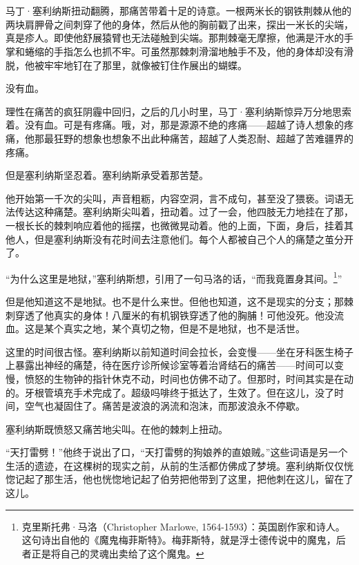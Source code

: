 \documentclass[AutoFakeBold=true]{book}
\begin{document}
\chapter{}

马丁·塞利纳斯扭动翻腾，那痛苦带着十足的诗意。一根两米长的钢铁荆棘从他的两块肩胛骨之间刺穿了他的身体，然后从他的胸前戳了出来，探出一米长的尖端，真是疹人。即使他舒展猿臂也无法碰触到尖端。那荆棘毫无摩擦，他满是汗水的手掌和蜷缩的手指怎么也抓不牢。可虽然那棘刺滑溜地触手不及，他的身体却没有滑脱，他被牢牢地钉在了那里，就像被钉住作展出的蝴蝶。

没有血。

理性在痛苦的疯狂阴霾中回归，之后的几小时里，马丁·塞利纳斯惊异万分地思索着。没有血。可是有疼痛。哦，对，那是源源不绝的疼痛——超越了诗人想象的疼痛，他那最狂野的想象也想象不出此种痛苦，超越了人类忍耐、超越了苦难疆界的疼痛。

但是塞利纳斯坚忍着。塞利纳斯承受着那苦楚。

他开始第一千次的尖叫，声音粗粝，内容空洞，言不成句，甚至没了猥亵。词语无法传达这种痛楚。塞利纳斯尖叫着，扭动着。过了一会，他四肢无力地挂在了那，一根长长的棘刺响应着他的摇摆，也微微晃动着。他的上面，下面，身后，挂着其他人，但是塞利纳斯没有花时间去注意他们。每个人都被自己个人的痛楚之茧分开了。

{\kaishu ``为什么这里是地狱，''}塞利纳斯想，引用了一句马洛的话，{\kaishu ``而我竟置身其间。\footnote{克里斯托弗·马洛（Christopher Marlowe, 1564-1593）：英国剧作家和诗人。这句诗出自他的《魔鬼梅菲斯特》。梅菲斯特，就是浮士德传说中的魔鬼，后者正是将自己的灵魂出卖给了这个魔鬼。}''}

但是他知道这不是地狱。也不是什么来世。但他也知道，这不是现实的分支；那棘刺穿透了他真实的身体！八厘米的有机钢铁穿透了他的胸脯！可他没死。他没流血。这是某个真实之地，某个真切之物，但是不是地狱，也不是活世。

这里的时间很古怪。塞利纳斯以前知道时间会拉长，会变慢——坐在牙科医生椅子上暴露出神经的痛楚，待在医疗诊所候诊室等着治肾结石的痛苦——时间可以变慢，愤怒的生物钟的指针休克不动，时间也仿佛不动了。但那时，时间其实是在动的。牙根管填充手术完成了。超级吗啡终于抵达了，生效了。但在这儿，没了时间，空气也凝固住了。痛苦是波浪的涡流和泡沫，而那波浪永不停歇。

塞利纳斯既愤怒又痛苦地尖叫。在他的棘刺上扭动。

``天打雷劈！''他终于说出了口，``天打雷劈的狗娘养的直娘贼。''这些词语是另一个生活的遗迹，在这棵树的现实之前，从前的生活都仿佛成了梦境。塞利纳斯仅仅恍惚记起了那生活，他也恍惚地记起了伯劳把他带到了这里，把他刺在这儿，留在了这儿。
\end{document}

